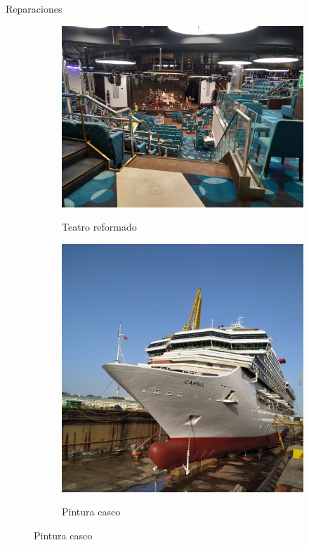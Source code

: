 \documentclass{beamer}
\begin{document}
\begin{frame}{Reparaciones}

\begin{figure}
\centering
\begin{subfigure}[h]{0.5\textwidth} 
\includegraphics[width=\textwidth]{teatro}
\label{Teatro reparado}
\caption{Teatro reformado}
\end{subfigure}       
\begin{subfigure}[h]{0.45\textwidth} 
\includegraphics[width=\textwidth]{carn}
\label{Pintura}
\caption{Pintura casco}
\end{subfigure}
\end{figure}

\end{frame}	
\end{document}
